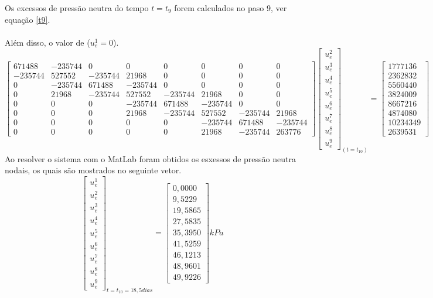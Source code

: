 \documentclass{article} %
\begin{document}
Os excessos de pressão neutra do tempo \(t=t_9\) forem calculados no paso 9, ver equação \ref{t9}.\\
\\
\indent Além disso, o valor de (\(u_e^1=0\)).\\

\begin{equation*}
\begin{bmatrix}
671488& -235744& 0& 0& 0& 0& 0& 0\\
-235744&527552&-235744&21968& 0& 0& 0& 0\\
0&-235744&671488&-235744& 0& 0& 0& 0\\
0&21968&-235744&527552&-235744&21968& 0& 0\\
0&0&0& -235744&671488&-235744& 0& 0\\
0&0&0&21968&-235744&527552&-235744&21968\\
0&0&0&0&0&-235744&671488&-235744\\
0&0&0&0&0&21968&-235744&263776
\end{bmatrix}\begin{bmatrix}
u_e^2\\
u_e^3\\
u_e^4\\
u_e^5\\
u_e^6\\
u_e^7\\
u_e^8\\
u_e^9
\end{bmatrix}_{(t=t_10)}
=\begin{bmatrix}
1777136\\
2362832\\
5560440\\
3824009\\
8667216\\
4874080\\
10234349\\
2639531
\end{bmatrix}
\end{equation*}
\indent Ao resolver o sistema com o MatLab foram obtidos os esxessos de pressão neutra nodais, os quais são mostrados no seguinte vetor.
\begin{equation}\label{t10}
\begin{bmatrix}
u_e^1\\
u_e^2\\
u_e^3\\
u_e^4\\
u_e^5\\
u_e^6\\
u_e^7\\
u_e^8\\
u_e^9
\end{bmatrix}_{t=t_{10}=18,5dias}=\begin{bmatrix}
0,0000\\
9,5229\\
19,5865\\
27,5835\\
35,3950\\
41,5259\\
46,1213\\
48,9601\\
49,9226
\end{bmatrix}kPa
\end{equation}
\end{document}
